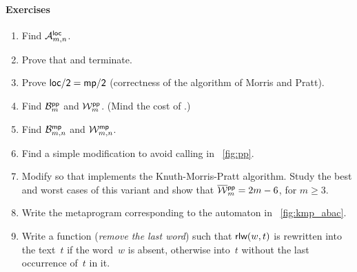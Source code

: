 
\paragraph{Exercises}

\begin{enumerate}

  \item Find \(\M{\fun{loc}}{m,n}\).

  \item Prove that  and  terminate.

  \item Prove \(\fun{loc/2} = \fun{mp/2}\) (correctness of the
    algorithm of Morris and Pratt).

  \item Find \(\B{\fun{pp}}{m}\) and \(\W{\fun{pp}}{m}\). (Mind
    the cost of .)

  \item Find \(\B{\fun{mp}}{m,n}\) and \(\W{\fun{mp}}{m,n}\).

  \item Find a simple modification to avoid calling  in
  \fig~\vref{fig:pp}.\label{factoring:trick}

  \item Modify  so that  implements the
    Knuth\hyp{}Morris\hyp{}Pratt algorithm. Study the best and worst
    cases of this variant and show that \(\OW{\fun{pp}}{m} = 2m-6\),
    for \(m \geqslant 3\).

  \item Write the metaprogram corresponding to the automaton in
    \fig~\vref{fig:kmp_abac}.

  \item Write a function 
    (\emph{remove the last word}) such that \(\fun{rlw}(w,t)\) is
    rewritten into the text~\(t\) if the word~\(w\) is absent,
    otherwise into~\(t\) without the last occurrence of~\(t\) in it.

\end{enumerate}
